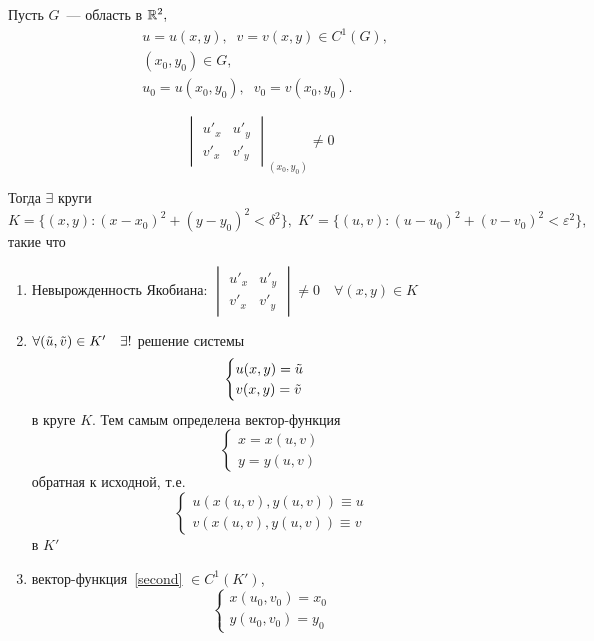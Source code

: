 \begin{theorem}[из матана]
    Пусть $G$~--- область в $\mathbb{R}^2,$
    \begin{align*}
        &u=u(x,y),\;\; v=v(x,y) \in C^1(G),\\
        &(x_0, y_0) \in G,\\
        &u_0=u(x_0, y_0),\;\; v_0=v(x_0, y_0).
    \end{align*}
    
    \[\begin{vmatrix}
		u'_x & u'_y \\ v'_x & v'_y
    \end{vmatrix}_{(x_0, y_0)} \neq 0\]
    
    Тогда $\exists$ круги \[
    K=\{(x,y): (x-x_0)^2 + (y-y_0)^2 < \delta^2\},\; K'=\{(u,v): (u-u_0)^2+(v-v_0)^2<\varepsilon^2\},\] такие что
    \begin{enumerate}
        \item Невырожденность Якобиана: $\begin{vmatrix}
		u'_x & u'_y \\ v'_x & v'_y
    \end{vmatrix} \neq 0 \quad \forall (x,y) \in K$
    
        \item $\forall (\Tilde{u}, \Tilde{v})\in K' \quad \exists!$ решение системы 
        \begin{equation*}
            \begin{cases}
               u(x,y)=\Tilde{u}\\
               v(x,y)=\Tilde{v}
             \end{cases}
        \end{equation*}
        в круге $K$. Тем самым определена вектор-функция 
        \begin{equation}
        \label{second}
            \begin{cases}
               x=x(u,v)\\
               y=y(u,v)
             \end{cases}
        \end{equation}
        обратная к исходной, т.е.
        \begin{equation}
        \label{third}
            \begin{cases}
               u(x(u,v), y(u,v)) \equiv u\\
               v(x(u,v), y(u,v)) \equiv v
             \end{cases}
        \end{equation}
        в $K'$
        \item вектор-функция~\eqref{second} $\in C^1(K')$,
        \begin{equation*}
            \begin{cases}
               x(u_0,v_0)=x_0\\
               y(u_0,v_0)=y_0
             \end{cases}
        \end{equation*}
    \end{enumerate}
\end{theorem}

